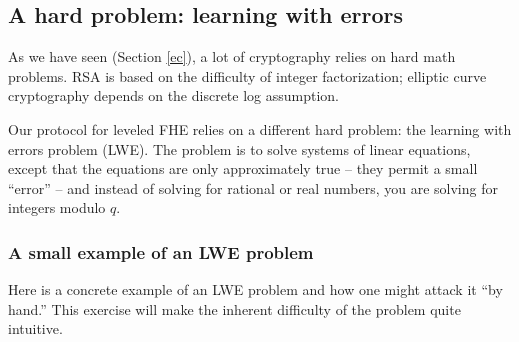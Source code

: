 \subsection{A hard problem: learning with errors}\label{lwe}

As we have seen (Section \ref{ec}), a lot of cryptography relies on hard math
problems. RSA is based on the difficulty of integer factorization;
elliptic curve cryptography depends on the discrete log assumption.

Our protocol for leveled FHE relies on a different hard problem: the
learning with errors problem (LWE). The problem is to solve systems of
linear equations, except that the equations are only approximately true
-- they permit a small ``error'' -- and instead of solving for rational
or real numbers, you are solving for integers modulo \(q\).

\subsubsection{A small example of an LWE problem}\label{lwe-small}

Here is a concrete example of an LWE problem and how one might attack it
``by hand.'' This exercise will make the inherent difficulty of the
problem quite intuitive.


